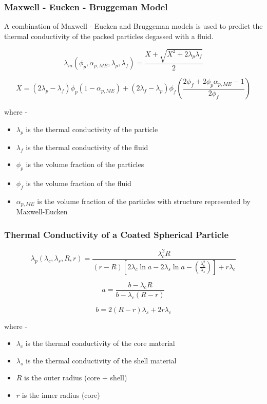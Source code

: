 \documentclass[../main.tex]{subfiles}
\begin{document}
\subsubsection{Maxwell - Eucken - Bruggeman Model}

A combination of Maxwell - Eucken and Bruggeman models is used to predict the thermal conductivity of the packed particles degassed with a fluid.

\begin{equation}
\lambda_m \left( \phi_p, \alpha_{p,ME}, \lambda_p, \lambda_f \right) = \frac{X + \sqrt{X^2 + 2\lambda_p\lambda_f}}{2}
\end{equation}

$$
    X = \left( 2\lambda_p - \lambda_f \right) \phi_p \left( 1 - \alpha_{p,ME} \right) + \left( 2\lambda_f - \lambda_p \right) \phi_f \left( \frac{2\phi_f + 2\phi_p\alpha_{p,ME}-1}{2\phi_f} \right)
$$

where -

\begin{itemize}
    \item $\lambda_p$ is the thermal conductivity of the particle
    \item $\lambda_f$ is the thermal conductivity of the fluid
    \item $\phi_p$ is the volume fraction of the particles
    \item $\phi_f$ is the volume fraction of the fluid
    \item $\alpha_{p,ME}$ is the volume fraction of the particles with structure represented by Maxwell-Eucken
\end{itemize}

\subsubsection{Thermal Conductivity of a Coated Spherical Particle}

\begin{equation}
\lambda_p \left( \lambda_c, \lambda_s, R, r \right) = \frac{\lambda_c^2 R}{ \left( r - R \right) \left[ 2\lambda_c \ln{a} - 2\lambda_s \ln{a} - \left( \frac{\lambda_c^2}{\lambda_s} \right) \right] + r\lambda_c }
\end{equation}

$$
a = \frac{b - \lambda_c R}{b - \lambda_c \left( R - r \right)}
$$

$$
b = 2 \left( R - r \right) \lambda_s + 2r \lambda_c
$$

where -

\begin{itemize}
    \item $\lambda_c$ is the thermal conductivity of the core material
    \item $\lambda_s$ is the thermal conductivity of the shell material
    \item $R$ is the outer radius (core + shell)
    \item $r$ is the inner radius (core)
\end{itemize}
\end{document}
